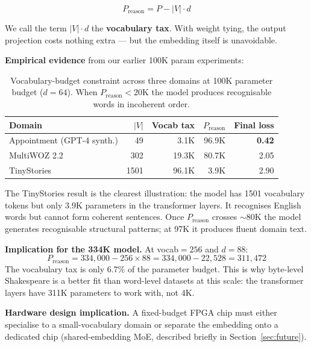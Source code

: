 \documentclass[11pt]{article}
\begin{document}
\begin{equation}
P_{\text{reason}} = P - |V| \cdot d
\label{eq:vocab-budget}
\end{equation}

We call the term $|V| \cdot d$ the \textbf{vocabulary tax}. With weight tying, the
output projection costs nothing extra --- but the embedding itself is unavoidable.

\textbf{Empirical evidence} from our earlier 100K param experiments:

\begin{table}[H]
\centering
\begin{tabular}{lrrrr}
\toprule
Domain & $|V|$ & Vocab tax & $P_\text{reason}$ & Final loss \\
\midrule
Appointment (GPT-4 synth.) & 49   & 3.1K  & 96.9K & \textbf{0.42} \\
MultiWOZ 2.2               & 302  & 19.3K & 80.7K & 2.05 \\
TinyStories                & 1501 & 96.1K & 3.9K  & 2.90 \\
\bottomrule
\end{tabular}
\caption{Vocabulary-budget constraint across three domains at 100K parameter budget
($d{=}64$). When $P_\text{reason} < 20$K the model produces recognisable words in
incoherent order.}
\label{tab:vocab-budget}
\end{table}

The TinyStories result is the clearest illustration: the model has 1501 vocabulary
tokens but only 3.9K parameters in the transformer layers. It recognises English
words but cannot form coherent sentences. Once $P_{\text{reason}}$ crosses $\sim$80K
the model generates recognisable structural patterns; at 97K it produces fluent
domain text.

\textbf{Implication for the 334K model.} At vocab$=256$ and $d{=}88$:
\[
P_{\text{reason}} = 334{,}000 - 256 \times 88 = 334{,}000 - 22{,}528 = 311{,}472
\]
The vocabulary tax is only 6.7\% of the parameter budget. This is why byte-level
Shakespeare is a better fit than word-level datasets at this scale: the transformer
layers have 311K parameters to work with, not 4K.

\textbf{Hardware design implication.} A fixed-budget FPGA chip must either
specialise to a small-vocabulary domain or separate the embedding onto a dedicated
chip (shared-embedding MoE, described briefly in Section~\ref{sec:future}).

\end{document}
